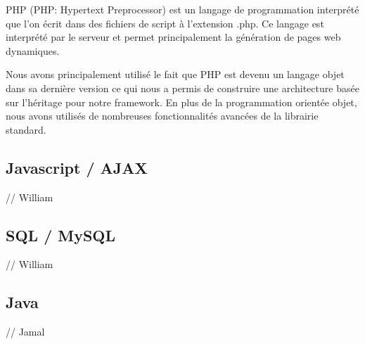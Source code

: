 PHP \cite{php} (PHP: Hypertext Preprocessor) est un langage de programmation interprété que l'on écrit
dans des fichiers de script à l'extension .php. Ce langage est interprété par le serveur
et permet principalement la génération de pages web dynamiques.

Nous avons principalement utilisé le fait que PHP est devenu un langage objet dans sa dernière version
ce qui nous a permis de construire une architecture basée sur l'héritage pour notre framework.
En plus de la programmation orientée objet, nous avons utilisés de nombreuses fonctionnalités avancées
de la librairie standard.

        \subsection{Javascript / AJAX}

// William

        \subsection{SQL / MySQL}

// William

        \subsection{Java}

// Jamal
